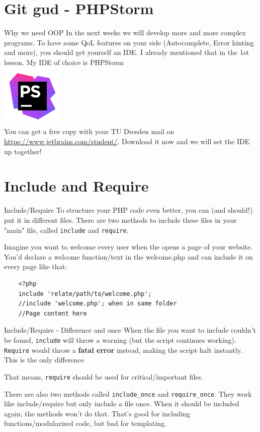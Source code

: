 \section{Git gud - PHPStorm}
\begin{frame}{Why we need OOP}
	In the next weeks we will develop more and more complex programs. \pause To have some QoL features on your side (Autocomplete, Error hinting and more), you should get yourself an IDE. I already mentioned that in the 1st lesson. \pause My IDE of choice is PHPStorm
	\\\includegraphics[width=3cm]{img/phpstorm.png}\\
	You can get a free copy with your TU Dresden mail on \url{https://www.jetbrains.com/student/}. Download it now and we will set the IDE up together!
\end{frame}

\section{Include and Require}
\begin{frame}[fragile]{Include/Require}
	To structure your PHP code even better, you can (and should!) put it in different files. There are two methods to include these files in your "main" file, called \texttt{include} and \texttt{require}.
	
Imagine you want to welcome every user when the opens a page of your website. You'd declare a welcome function/text in the welcome.php and can include it on every page like that: \pause
	\begin{lstlisting}
	<?php
	include 'relate/path/to/welcome.php';
	//include 'welcome.php'; when in same folder
	//Page content here
	\end{lstlisting}
\end{frame}

\begin{frame}[fragile]{Include/Require - Difference and once}
When the file you want to include couldn't be found, \texttt{include} will throw a warning (but the script continues working). \texttt{Require} would throw a \textbf{fatal error} instead, making the script halt instantly. This is the only difference \pause

That means, \texttt{require} should be used for critical/important files. \pause

There are also two methods called \texttt{include\_{}once} and \texttt{require\_{}once}. They work like include/require but only include a file once. When it should be included again, the methods won't do that. That's good for including functions/modularized code, but bad for templating.
\end{frame}

